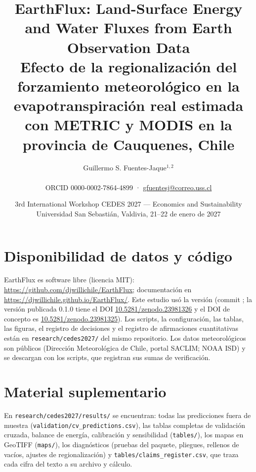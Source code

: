 \documentclass[11pt,a4paper]{article}
\title{\textbf{EarthFlux: Land-Surface Energy and Water Fluxes from Earth Observation Data}\\[4pt]
\large Efecto de la regionalización del forzamiento meteorológico en la
evapotranspiración real estimada con METRIC y MODIS en la provincia de
Cauquenes, Chile}
\author{Guillermo S. Fuentes-Jaque$^{1,2}$\\[2pt]
\small \AuthorAffiliation\\
\small ORCID 0000-0002-7864-4899 · \href{mailto:gfuentesj@correo.uss.cl}{gfuentesj@correo.uss.cl}}
\date{\small 3rd International Workshop CEDES 2027 --- Economics and Sustainability\\
Universidad San Sebastián, Valdivia, 21--22 de enero de 2027}
\begin{document}
\maketitle









\section*{Disponibilidad de datos y código}
EarthFlux es software libre (licencia MIT):
\url{https://github.com/djwillichile/EarthFlux}; documentación en
\url{https://djwillichile.github.io/EarthFlux/}. Este estudio usó la versión
\EarthFluxVersion{} (commit \texttt{\EarthFluxCommit}; la versión publicada
0.1.0 tiene el DOI \href{https://doi.org/10.5281/zenodo.23981326}{10.5281/zenodo.23981326}
y el DOI de concepto es \href{https://doi.org/10.5281/zenodo.23981325}{10.5281/zenodo.23981325}).
Los scripts, la configuración, las tablas, las figuras, el registro de
decisiones y el registro de afirmaciones cuantitativas están en
\texttt{research/cedes2027/} del mismo repositorio. Los datos meteorológicos
son públicos (Dirección Meteorológica de Chile, portal SACLIM; NOAA ISD) y
se descargan con los scripts, que registran sus sumas de verificación.

\section*{Material suplementario}
En \texttt{research/cedes2027/results/} se encuentran: todas las
predicciones fuera de muestra (\texttt{validation/cv\_predictions.csv}), las
tablas completas de validación cruzada, balance de energía, calibración y
sensibilidad (\texttt{tables/}), los mapas en GeoTIFF (\texttt{maps/}), los
diagnósticos (pruebas del paquete, pliegues, rellenos de vacíos, ajustes de
regionalización) y \texttt{tables/claims\_register.csv}, que traza cada cifra
del texto a su archivo y cálculo.

\printbibliography[heading=bibintoc,title={Referencias}]
\end{document}
